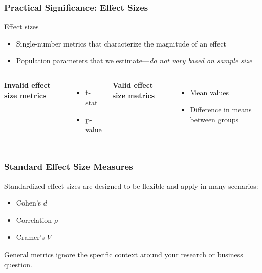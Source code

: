 \documentclass[12pt, block=fill]{beamer}
\begin{document}
\begin{frame}
  \frametitle{Practical Significance: Effect Sizes}
  \begin{block}{Effect sizes} 
    \begin{itemize}
    \item Single-number metrics that characterize the
      magnitude of an effect
    \item Population parameters that we estimate—\textit{do not vary
        based on sample size}
    \end{itemize}
  \end{block}
  \vspace{1em} 
  \begin{columns}[t]
    \textbf{Invalid effect size metrics}
    \begin{itemize}
    \item t-stat
    \item p-value 
    \end{itemize}
    \textbf{Valid effect size metrics} 
    \begin{itemize}
    \item Mean values 
    \item Difference in means between groups
    \end{itemize}
  \end{columns} 
\end{frame}

\begin{frame}
  \frametitle{Standard Effect Size Measures}
  Standardized effect sizes are designed to be flexible and apply in
  many scenarios:
  \begin{itemize}
  \item Cohen's $d$
  \item Correlation $\rho$
  \item Cramer's $V$
  \end{itemize}
  General metrics ignore the specific context around your research or
  business question.
  \end{frame}
\end{document}
